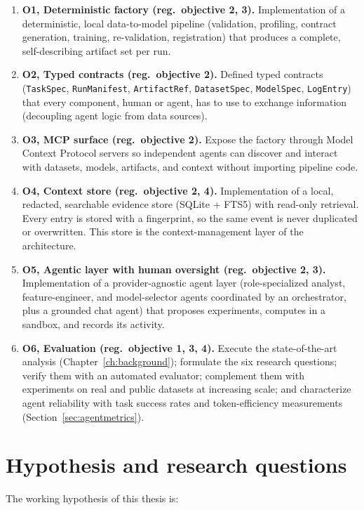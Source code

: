 \begin{enumerate}
	\item \textbf{O1, Deterministic factory (reg.\ objective 2, 3).} Implementation of a deterministic, local data-to-model pipeline (validation, profiling, contract generation, training, re-validation, registration) that produces a complete, self-describing artifact set per run.
	\item \textbf{O2, Typed contracts (reg.\ objective 2).} Defined typed contracts (\texttt{TaskSpec}, \texttt{RunManifest}, \texttt{ArtifactRef}, \texttt{DatasetSpec}, \texttt{ModelSpec}, \texttt{LogEntry}) that every component, human or agent, has to use to exchange information (decoupling agent logic from data sources).
	\item \textbf{O3, MCP surface (reg.\ objective 2).} Expose the factory through Model Context Protocol servers so independent agents can discover and interact with datasets, models, artifacts, and context without importing pipeline code.
	\item \textbf{O4, Context store (reg.\ objective 2, 4).} Implementation of a local, redacted, searchable evidence store (SQLite + FTS5) with read-only retrieval. Every entry is stored with a fingerprint, so the same event is never duplicated or overwritten. This store is the context-management layer of the architecture.
	\item \textbf{O5, Agentic layer with human oversight (reg.\ objective 2, 3).} Implementation of a provider-agnostic agent layer (role-specialized analyst, feature-engineer, and model-selector agents coordinated by an orchestrator, plus a grounded chat agent) that proposes experiments, computes in a sandbox, and records its activity.
	\item \textbf{O6, Evaluation (reg.\ objective 1, 3, 4).} Execute the state-of-the-art analysis (Chapter~\ref{ch:background}); formulate the six research questions; verify them with an automated evaluator; complement them with experiments on real and public datasets at increasing scale; and characterize agent reliability with task success rates and token-efficiency measurements (Section~\ref{sec:agentmetrics}).
\end{enumerate}

\section{Hypothesis and research questions}
\label{sec:hypothesis}

The working hypothesis of this thesis is:

